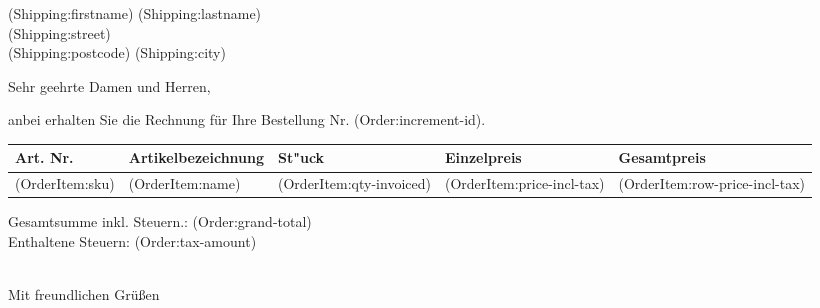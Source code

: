 \documentclass[DIN, pagenumber=false, parskip=half,%
               fromalign=right, fromphone=true, fromfax=true,
               fromrule=false]{scrlttr2}
\begin{document}
 

\begin{letter}{(Shipping:firstname) (Shipping:lastname) \\ (Shipping:street) \\ (Shipping:postcode) (Shipping:city)}

\opening{Sehr geehrte Damen und Herren,}

anbei erhalten Sie die Rechnung für Ihre Bestellung Nr. (Order:increment-id). \\


\begin{longtable}{p{2.5cm}p{6.5cm}p{2cm}p{2cm}p{2cm}}

\hline 	
Art. Nr. & Artikelbezeichnung & St"uck & Einzelpreis & Gesamtpreis\\
\hline 
(OrderItem:sku) & (OrderItem:name) & (OrderItem:qty-invoiced) &(OrderItem:price-incl-tax) & (OrderItem:row-price-incl-tax)\\
\hline 
\hline 
\end{longtable}
Gesamtsumme inkl. Steuern.: (Order:grand-total) \\
Enthaltene Steuern: (Order:tax-amount) \\



\closing{\\ Mit freundlichen Grüßen}
\end{letter}
 
\end{document}
